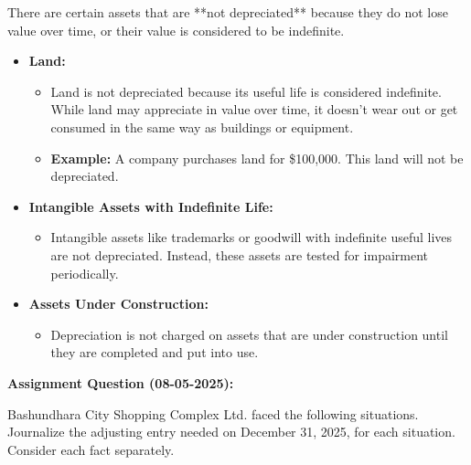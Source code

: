 \documentclass[12pt,a4paper]{book}
\begin{document}
There are certain assets that are **not depreciated** because they do not lose value over time, or their value is considered to be indefinite.

\begin{itemize}
    \item \textbf{Land:}
    \begin{itemize}
        \item Land is not depreciated because its useful life is considered indefinite. While land may appreciate in value over time, it doesn't wear out or get consumed in the same way as buildings or equipment.
        \item \textbf{Example:} A company purchases land for \$100,000. This land will not be depreciated.
    \end{itemize}
    
    \item \textbf{Intangible Assets with Indefinite Life:}
    \begin{itemize}
        \item Intangible assets like trademarks or goodwill with indefinite useful lives are not depreciated. Instead, these assets are tested for impairment periodically.
    \end{itemize}
    
    \item \textbf{Assets Under Construction:}
    \begin{itemize}
        \item Depreciation is not charged on assets that are under construction until they are completed and put into use.
    \end{itemize}
\end{itemize}

\vspace{0.5cm}
\clearpage

\textbf{Assignment Question (08-05-2025):}

Bashundhara City Shopping Complex Ltd. faced the following situations. Journalize the adjusting entry needed on December 31, 2025, for each situation. Consider each fact separately.
\end{document}
